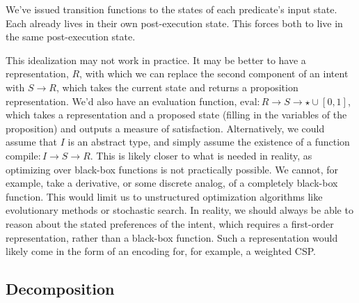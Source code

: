 We've issued transition functions to the states of each predicate's input state. Each already lives in their own post-execution state. This forces both to live in the same post-execution state.



This idealization may not work in practice. It may be better to have a representation, $R$, with which we can replace the second component of an intent with $S \rightarrow R$, which takes the current state and returns a proposition representation. We'd also have an evaluation function, $\text{eval} : R \rightarrow S \rightarrow \star \cup [0, 1]$, which takes a representation and a proposed state (filling in the variables of the proposition) and outputs a measure of satisfaction. Alternatively, we could assume that $I$ is an abstract type, and simply assume the existence of a function $\text{compile} : I \rightarrow S \rightarrow R$. This is likely closer to what is needed in reality, as optimizing over black-box functions is not practically possible. We cannot, for example, take a derivative, or some discrete analog, of a completely black-box function. This would limit us to unstructured optimization algorithms like evolutionary methods or stochastic search. In reality, we should always be able to reason about the stated preferences of the intent, which requires a first-order representation, rather than a black-box function. Such a representation would likely come in the form of an encoding for, for example, a weighted CSP.

\subsection{Decomposition}

